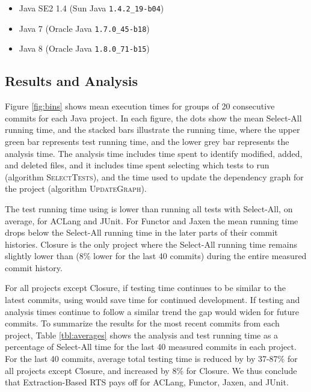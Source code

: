 {\begin{itemize}
  \item Java SE2 1.4 (Sun Java \verb'1.4.2_19-b04')
  \item Java 7 (Oracle Java \verb'1.7.0_45-b18')
  \item Java 8 (Oracle Java \verb'1.8.0_71-b15')
\end{itemize}

\subsection{Results and Analysis}

Figure \ref{fig:bins} shows mean execution times for groups of 20 consecutive commits for each Java
project.  In each figure, the dots show the mean Select-All running time, and the stacked bars
illustrate the \ourtool{} running time, where the upper green bar represents test running time, and
the lower grey bar represents the analysis time.  The analysis time includes time spent to identify
modified, added, and deleted files, and it includes time spent selecting which tests to run
(algorithm \textsc{SelectTests}), and the time used to update the dependency graph for the project
(algorithm \textsc{UpdateGraph}).

The test running time using \ourtool{} is lower than running all tests with Select-All, on average,
for ACLang and JUnit. For Functor and Jaxen the mean \ourtool{} running time drops below the
Select-All running time in the later parts of their commit histories. Closure is the only project
where the Select-All running time remains slightly lower than \ourtool{} (8\% lower for the last 40
commits) during the entire measured commit history.

\begin{figure*}
  \centering
  \def\svgwidth{\textwidth}
  
  \caption{Testing time, means for bins of 20 commits. Test selection pays off when the red dot is
  above the stacked bars.}
  \label{fig:bins}
\end{figure*}

For all projects except Closure, if testing time continues to be similar to the latest commits,
using \ourtool{} would save time for continued development. If testing and analysis times continue
to follow a similar trend the gap would widen for future commits.  To summarize the results for the
most recent commits from each project, Table \ref{tbl:averages} shows the \ourtool{} analysis and
test running time as a percentage of Select-All time for the last 40 measured commits in each
project.  For the last 40 commits, average total testing time is reduced by by 37-87\% for all
projects except Closure, and increased by 8\% for Closure. We thus conclude that Extraction-Based
RTS pays off for ACLang, Functor, Jaxen, and JUnit.

}
